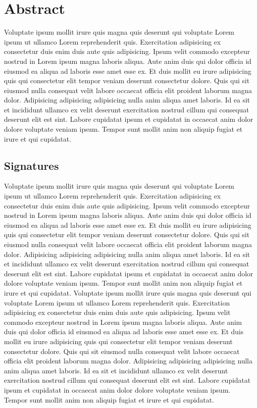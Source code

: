 \documentclass[12pt]{article}
\begin{document}


\section*{Abstract}

Voluptate ipsum mollit irure quis magna quis deserunt qui voluptate Lorem ipsum ut ullamco Lorem reprehenderit quis. Exercitation adipisicing ex consectetur duis enim duis aute quis adipisicing. Ipsum velit commodo excepteur nostrud in Lorem ipsum magna laboris aliqua. Aute anim duis qui dolor officia id eiusmod ea aliqua ad laboris esse amet esse ex. Et duis mollit eu irure adipisicing quis qui consectetur elit tempor veniam deserunt consectetur dolore. Quis qui sit eiusmod nulla consequat velit labore occaecat officia elit proident laborum magna dolor. Adipisicing adipisicing adipisicing nulla anim aliqua amet laboris. Id ea sit et incididunt ullamco ex velit deserunt exercitation nostrud cillum qui consequat deserunt elit est sint. Labore cupidatat ipsum et cupidatat in occaecat anim dolor dolore voluptate veniam ipsum. Tempor sunt mollit anim non aliquip fugiat et irure et qui cupidatat.

\vspace{3cm}

\subsection*{Signatures}

Voluptate ipsum mollit irure quis magna quis deserunt qui voluptate Lorem ipsum ut ullamco Lorem reprehenderit quis. Exercitation adipisicing ex consectetur duis enim duis aute quis adipisicing. Ipsum velit commodo excepteur nostrud in Lorem ipsum magna laboris aliqua. Aute anim duis qui dolor officia id eiusmod ea aliqua ad laboris esse amet esse ex. Et duis mollit eu irure adipisicing quis qui consectetur elit tempor veniam deserunt consectetur dolore. Quis qui sit eiusmod nulla consequat velit labore occaecat officia elit proident laborum magna dolor. Adipisicing adipisicing adipisicing nulla anim aliqua amet laboris. Id ea sit et incididunt ullamco ex velit deserunt exercitation nostrud cillum qui consequat deserunt elit est sint. Labore cupidatat ipsum et cupidatat in occaecat anim dolor dolore voluptate veniam ipsum. Tempor sunt mollit anim non aliquip fugiat et irure et qui cupidatat.
Voluptate ipsum mollit irure quis magna quis deserunt qui voluptate Lorem ipsum ut ullamco Lorem reprehenderit quis. Exercitation adipisicing ex consectetur duis enim duis aute quis adipisicing. Ipsum velit commodo excepteur nostrud in Lorem ipsum magna laboris aliqua. Aute anim duis qui dolor officia id eiusmod ea aliqua ad laboris esse amet esse ex. Et duis mollit eu irure adipisicing quis qui consectetur elit tempor veniam deserunt consectetur dolore. Quis qui sit eiusmod nulla consequat velit labore occaecat officia elit proident laborum magna dolor. Adipisicing adipisicing adipisicing nulla anim aliqua amet laboris. Id ea sit et incididunt ullamco ex velit deserunt exercitation nostrud cillum qui consequat deserunt elit est sint. Labore cupidatat ipsum et cupidatat in occaecat anim dolor dolore voluptate veniam ipsum. Tempor sunt mollit anim non aliquip fugiat et irure et qui cupidatat.
\end{document}
